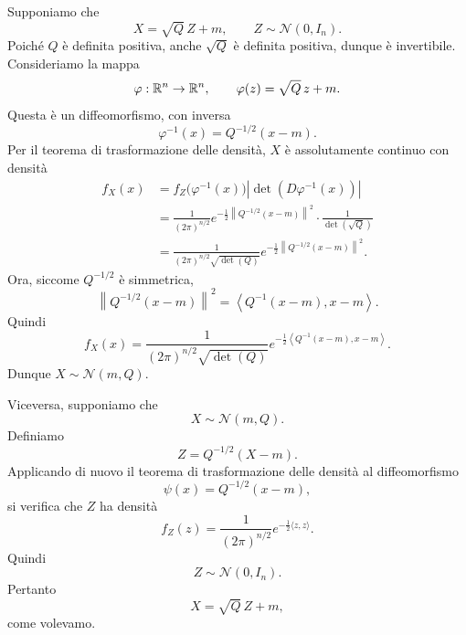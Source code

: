\documentclass[a4paper]{article}
\begin{document}
\begin{snippetproof}{}
    \begin{iffproof}
    \item
        Supponiamo che
        \[
            X=\sqrt Q\,Z+m,
            \qquad
            Z\sim\mathcal N(0,I_n).
        \]
        Poiché \(Q\) è definita positiva, anche \(\sqrt Q\) è definita positiva, dunque è invertibile.
        Consideriamo la mappa
        \[
            \varphi:\mathbb{R}^n\to\mathbb{R}^n,
            \qquad
            \varphi(z)=\sqrt Q\,z+m.
        \]
        Questa è un diffeomorfismo, con inversa
        \[
            \varphi^{-1}(x)
            =
            Q^{-1/2}(x-m).
        \]
        Per il teorema di trasformazione delle densità, \(X\) è assolutamente continuo con densità
        \begin{align*}
            f_X(x)
            &=
            f_Z\bigl(\varphi^{-1}(x)\bigr)
            \left|\det\left(D\varphi^{-1}(x)\right)\right|\\
            &=
            \frac{1}{(2\pi)^{n/2}}
            e^{-\frac12\left\|Q^{-1/2}(x-m)\right\|^2}
            \cdot
            \frac{1}{\det(\sqrt Q)}\\
            &=
            \frac{1}{(2\pi)^{n/2}\sqrt{\det(Q)}}
            e^{-\frac12\left\|Q^{-1/2}(x-m)\right\|^2}.
        \end{align*}
        Ora, siccome \(Q^{-1/2}\) è simmetrica,
        \[
            \left\|Q^{-1/2}(x-m)\right\|^2
            =
            \left\langle Q^{-1}(x-m),x-m\right\rangle.
        \]
        Quindi
        \[
            f_X(x)
            =
            \frac{1}{(2\pi)^{n/2}\sqrt{\det(Q)}}
            e^{-\frac12\left\langle Q^{-1}(x-m),x-m\right\rangle}.
        \]
        Dunque \(X\sim\mathcal N(m,Q)\).

    \item
        Viceversa, supponiamo che
        \[
            X\sim\mathcal N(m,Q).
        \]
        Definiamo
        \[
            Z
            =
            Q^{-1/2}(X-m).
        \]
        Applicando di nuovo il teorema di trasformazione delle densità al diffeomorfismo
        \[
            \psi(x)=Q^{-1/2}(x-m),
        \]
        si verifica che \(Z\) ha densità
        \[
            f_Z(z)
            =
            \frac{1}{(2\pi)^{n/2}}
            e^{-\frac12\langle z,z\rangle}.
        \]
        Quindi
        \[
            Z\sim\mathcal N(0,I_n).
        \]
        Pertanto
        \[
            X=\sqrt Q\,Z+m,
        \]
        come volevamo.
    \end{iffproof}
\end{snippetproof}
\end{document}
